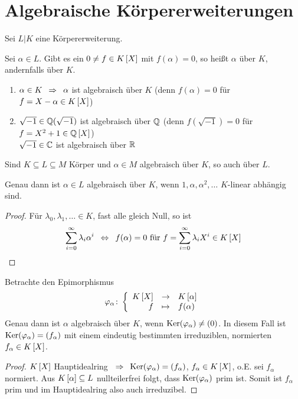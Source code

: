 \section{Algebraische Körpererweiterungen}
Sei $L | K$ eine Körpererweiterung.

\begin{definition}[!]
    Sei $\alpha \in L$. Gibt es ein $0 \neq f \in \polynom[K]$ mit $f(\alpha) = 0$, so heißt $\alpha$  über $K$, andernfalls  über $K$.
\end{definition}

\begin{beispiel}
    \begin{enumerate}[nolistsep, leftmargin=*, label=(\alph*)]
        \item $\alpha \in K \enskip \Rightarrow \enskip \alpha$ ist algebraisch über $K$ (denn $f(\alpha) = 0$ für $f = X - \alpha \in \polynom[K]$)
        \item $\sqrt{-1} \in \mathbb{Q}(\sqrt{-1})$ ist algebraisch über $\mathbb{Q}$ (denn $f(\sqrt{-1})=0$ für $f = X^2 + 1 \in \polynom[\Q]$) \\
        $\sqrt{-1} \in \mathbb{C}$ ist algebraisch über $\mathbb{R}$        
    \end{enumerate}
\end{beispiel}

\begin{bemerkung}
    Sind $K \subseteq L \subseteq M$ Körper und $\alpha \in M$ algebraisch über $K$, so auch über $L$.
\end{bemerkung}

\begin{lemma} \label{lemma: 1_2.4}
    Genau dann ist $\alpha \in L$ algebraisch über $K$, wenn $1, \alpha, \alpha^2 , \dots$ $K$-linear abhängig sind.
\end{lemma}
\begin{proof}
    Für $\lambda_0 , \lambda_1 , \dots \in K$, fast alle gleich Null, so ist
    \begin{equation*}
        \sum_{i=0}^\infty \lambda_i \alpha^i \equivalent f(\alpha) = 0 \text{ für } f = \sum_{i=0}^\infty \lambda_i X^i \in \polynom[K]
    \end{equation*}
\end{proof}

\begin{lemma}
    Betrachte den Epimorphismus
    \begin{equation*}
        \bigabb{\phi_\alpha}{\polynom[K]}{\polynom[K][\alpha]}{f}{f(\alpha)}
    \end{equation*}
    Genau dann ist $\alpha$ algebraisch über $K$, wenn $\operatorname{Ker}(\varphi_\alpha) \neq (0)$. In diesem Fall ist $\operatorname{Ker}(\varphi_\alpha) = (f_\alpha)$ mit einem eindeutig bestimmten irreduziblen, normierten $f_\alpha \in \polynom[K]$.
\end{lemma}
\begin{proof}
    $\polynom[K]$ Hauptidealring $\enskip \Rightarrow \enskip \operatorname{Ker}(\varphi_\alpha) = (f_\alpha)$, $f_\alpha \in \polynom[K]$, o.E. sei $f_\alpha$ normiert. Aus $\polynom[K][\alpha] \subseteq L$ nullteilerfrei folgt, dass $\operatorname{Ker}(\varphi_\alpha)$ prim ist. Somit ist $f_\alpha$ prim und im Hauptidealring also auch irreduzibel.
\end{proof}

